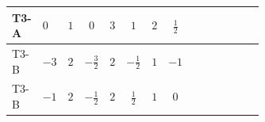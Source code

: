 \documentclass[8pt]{article}
\begin{document}
\begin{landscape}
\begin{longtable}{@{}llcccccc >{\raggedright\arraybackslash}p{0.21\linewidth} >{\raggedright\arraybackslash}p{0.21\linewidth} >{\raggedright\arraybackslash}p{0.21\linewidth}@{}}
\midrule
T3-A & $0$ & $1$ & $0$ & $3$ & $1$ & $2$ & $\frac{1}{2}$ & \scriptsize\adjustbox{max width=\linewidth}{$\begin{gathered} +\frac{3}{2} (\left({Y_d}\,\left({Y_d}\right)^{\dagger}\,{Y_d}\right)_{ij}-\left({Y_u}\,\left({Y_u}\right)^{\dagger}\,{Y_d}\right)_{ij})\end{gathered}$} & \scriptsize\adjustbox{max width=\linewidth}{$\begin{gathered} -\frac{9}{4} {g_2}^2 \left({Y_d}\right)_{ij}\end{gathered}$} & \scriptsize\adjustbox{max width=\linewidth}{$\begin{gathered} -8 {g_3}^2 \left({Y_d}\right)_{ij}\end{gathered}$} \\
\midrule
T3-B & $-3$ & $2$ & $-\frac{3}{2}$ & $2$ & $-\frac{1}{2}$ & $1$ & $-1$ & \scriptsize\adjustbox{max width=\linewidth}{$\begin{gathered} +\frac{3}{2} (\left({Y_d}\,\left({Y_d}\right)^{\dagger}\,{Y_d}\right)_{ij}-\left({Y_u}\,\left({Y_u}\right)^{\dagger}\,{Y_d}\right)_{ij})\end{gathered}$} & \scriptsize\adjustbox{max width=\linewidth}{$\begin{gathered} -\frac{9}{4} {g_2}^2 \left({Y_d}\right)_{ij}\end{gathered}$} & \scriptsize\adjustbox{max width=\linewidth}{$\begin{gathered} -8 {g_3}^2 \left({Y_d}\right)_{ij}\end{gathered}$} \\
\midrule
T3-B & $-1$ & $2$ & $-\frac{1}{2}$ & $2$ & $\frac{1}{2}$ & $1$ & $0$ & \scriptsize\adjustbox{max width=\linewidth}{$\begin{gathered} +\frac{3}{2} (\left({Y_d}\,\left({Y_d}\right)^{\dagger}\,{Y_d}\right)_{ij}-\left({Y_u}\,\left({Y_u}\right)^{\dagger}\,{Y_d}\right)_{ij})\end{gathered}$} & \scriptsize\adjustbox{max width=\linewidth}{$\begin{gathered} -\frac{9}{4} {g_2}^2 \left({Y_d}\right)_{ij}\end{gathered}$} & \scriptsize\adjustbox{max width=\linewidth}{$\begin{gathered} -8 {g_3}^2 \left({Y_d}\right)_{ij}\end{gathered}$} \\
\midrule

\end{longtable}
\end{landscape}
\end{document}
